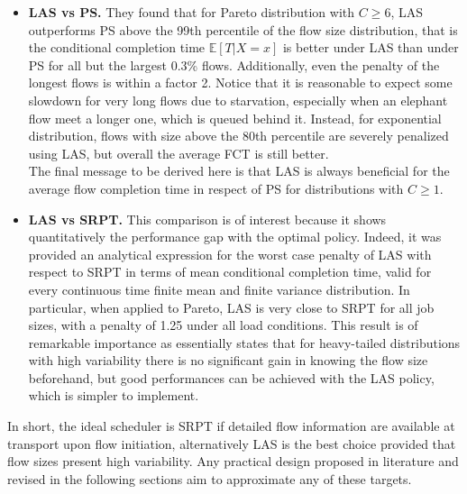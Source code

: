 \begin{itemize}
	\item \textbf{LAS vs PS.}  They found that for Pareto distribution with $C \ge 6$, LAS outperforms PS above the 99th percentile of the flow size distribution, that is the conditional completion time $\mathbb{E}[T | X = x]$ is better under LAS than under PS for all but the largest 0.3\% flows. Additionally, even the penalty of the longest flows is within a factor 2. Notice that it is reasonable to expect some slowdown for very long flows due to starvation, especially when an elephant flow meet a longer one, which is queued behind it. Instead, for exponential distribution, flows with size above the 80th percentile are severely penalized using LAS, but overall the average FCT is still better. \\
	The final message to be derived here is that LAS is always beneficial for the average flow completion time in respect of PS for distributions with $C\ge1$.
	 
	\item \textbf{LAS vs SRPT.} This comparison is of interest because it shows quantitatively the performance gap with the optimal policy. Indeed, it was provided an analytical expression for the worst case penalty of LAS with respect to SRPT in terms of mean conditional completion time, valid for every continuous time finite mean and finite variance distribution.  In particular, when applied to Pareto, LAS is very close to SRPT for all job sizes, with a penalty of 1.25 under all load conditions. This result is of remarkable importance as essentially states that for heavy-tailed distributions with high variability there is no significant gain in knowing the flow size beforehand, but good performances can be achieved with the LAS policy, which is simpler to implement.
\end{itemize}

In short, the ideal scheduler is SRPT if detailed flow information are available at transport upon flow initiation, alternatively LAS is the best choice provided that flow sizes present high variability. Any practical design proposed in literature and revised in the following sections aim to approximate any of these targets.

